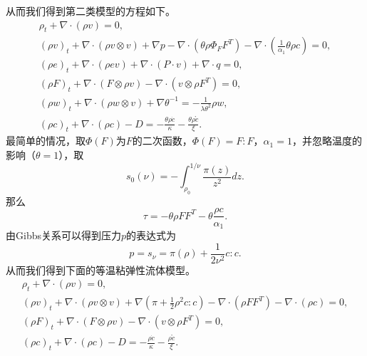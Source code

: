 从而我们得到第二类模型的方程如下。
\begin{subequations}
  \begin{align}
  \rho_t + \nabla \cdot (\rho v) = 0, \\
  (\rho v)_t + \nabla \cdot ( \rho v \otimes v) + \nabla p - \nabla \cdot (\theta \rho \Phi_F F^T) - \nabla \cdot (\frac{1}{\alpha_1}\theta \rho c) = 0, \\
  (\rho e)_t + \nabla \cdot (\rho e v) + \nabla \cdot (P \cdot v) + \nabla \cdot q = 0, \\
  (\rho F)_t + \nabla \cdot (F \otimes \rho v) - \nabla \cdot (v \otimes \rho F^T) = 0, \\
  (\rho w)_t + \nabla \cdot (\rho w \otimes v) + \nabla \theta^{-1} = -\frac{1}{\lambda \theta^2} \rho w, \\
  (\rho c)_t + \nabla \cdot (\rho c) - D  = -\frac{\theta \rho \dot{c}}{\kappa}  -\frac{\theta \rho \mathring{c}}{\xi}.
\end{align}
\end{subequations}
最简单的情况，取$\Phi(F)$为$F$的二次函数，$\Phi(F) = F:F$，$\alpha_1=1$，并忽略温度的影响（$\theta=1$），取
\begin{equation*}
    s_0(\nu) = -\int_{\rho_0}^{1/\nu} \frac{\pi(z)}{z^2} dz.
\end{equation*}
那么
\begin{equation*}
	\tau = -\theta \rho F F^T - \theta \frac{\rho c}{\alpha_1}.
\end{equation*}
由Gibbs关系可以得到压力$p$的表达式为
\begin{equation*}
    p = s_\nu = \pi(\rho) + \frac{1}{2\nu^2} c:c.
\end{equation*}
从而我们得到下面的等温粘弹性流体模型。
\begin{subequations}\label{eq:compressibleRelax}
  \begin{align}
  \rho_t + \nabla \cdot (\rho v) = 0, \\
  (\rho v)_t + \nabla \cdot ( \rho v \otimes v) + \nabla (\pi + \frac{1}{2}\rho^2c:c) - \nabla \cdot (\rho F F^T) - \nabla \cdot (\rho c) = 0, \\
    (\rho F)_t + \nabla \cdot (F \otimes \rho v) - \nabla \cdot (v \otimes \rho F^T) = 0, \\
  (\rho c)_t + \nabla \cdot (\rho c) - D  = -\frac{ \rho \dot{c}}{\kappa}  -\frac{ \rho \mathring{c}}{\xi}.
\end{align}
\end{subequations}



